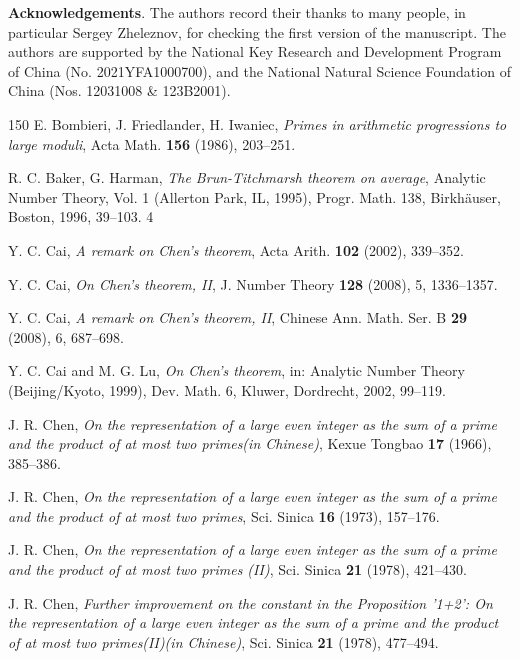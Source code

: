 \documentclass[12pt, a4paper]{amsart}
\theoremstyle{plain}
\theoremstyle{remark}
\numberwithin{equation}{section}
\begin{document}
\medskip 
\noindent 
{\bf Acknowledgements}. The authors record their thanks to many people, in particular Sergey Zheleznov, for 
checking the first version of the manuscript. The authors are supported by the National Key Research and Development 
Program of China (No. 2021YFA1000700), and the National Natural Science Foundation of China (Nos. 12031008 \& 123B2001). 
	
	\medskip 
	
	\begin{thebibliography}{150}
		 E. Bombieri, J. Friedlander, H. Iwaniec, 	\emph{Primes in arithmetic progressions to large moduli}, Acta Math. {\bf 156} (1986), 203--251.
		
		 R. C. Baker, G. Harman, 	\emph{The Brun-Titchmarsh theorem on average}, Analytic Number Theory, Vol. 1 (Allerton Park, IL, 1995), Progr. Math. 138, Birkhäuser, Boston, 1996, 39--103. 4
		
		 Y. C. Cai, 	\emph{A remark on Chen's theorem}, Acta Arith. {\bf 102} (2002), 339--352.
		
		 Y. C. Cai, 	\emph{On Chen's theorem, II}, J. Number Theory {\bf 128} (2008), 5, 1336--1357.
		
		 Y. C. Cai, 	\emph{A remark on Chen's theorem, II}, Chinese Ann. Math. Ser. B {\bf 29} (2008), 6, 687--698.
		
		Y. C. Cai and M. G. Lu,
		\emph{On Chen's theorem},
		in: Analytic Number Theory (Beijing/Kyoto, 1999), Dev. Math. 6, Kluwer, Dordrecht, 2002, 99--119.
		
J. R. Chen,
\emph{On the representation of a large even integer as the sum of a prime and the product of at most two primes(in Chinese)},
		Kexue Tongbao {\bf 17} (1966), 385--386.
		
J. R. Chen,
\emph{On the representation of a large even integer as the sum of a prime and the product of at most two primes},
Sci. Sinica {\bf 16} (1973), 157--176.
		
J. R. Chen,
\emph{On the representation of a large even integer as the sum of a prime and the product of at most two primes (II)},
Sci. Sinica {\bf 21} (1978), 421--430.
		
J. R. Chen,
\emph{Further improvement on the constant in the Proposition '1+2': On the representation of a large even integer as the sum of a prime and the product of at most two primes(II)(in Chinese)},
Sci. Sinica {\bf 21} (1978), 477--494.
		

\end{thebibliography}
\end{document}
